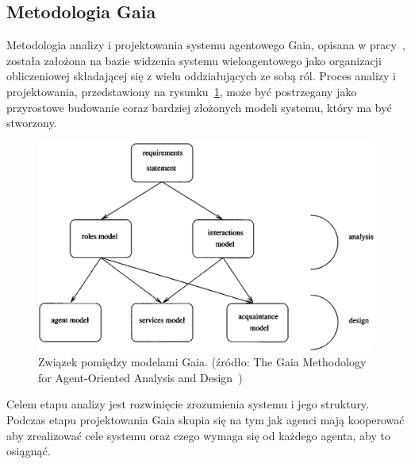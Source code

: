 \documentclass[11pt]{report}
\begin{document}
    \subsection{Metodologia Gaia}
    Metodologia analizy i projektowania systemu agentowego Gaia, opisana w pracy~\cite{Wooldridge2000a},
    została założona na bazie widzenia systemu wieloagentowego jako organizacji obliczeniowej składającej się z wielu oddziałujących ze sobą ról.
    Proces analizy i projektowania, przedstawiony na rysunku~\ref{fig:gaia}, może być postrzegany
    jako przyrostowe budowanie coraz bardziej złożonych modeli systemu, który ma być stworzony.
    \begin{figure}[!ht]
        \centering
        \includegraphics[width=\linewidth]{fig/gaia models.png}
        \caption{Związek pomiędzy modelami Gaia. (źródło: The Gaia Methodology for Agent-Oriented Analysis and Design~\cite{Wooldridge2000a})}
        \label{fig:gaia}
    \end{figure}
    Celem etapu analizy jest rozwinięcie zrozumienia systemu i jego struktury.
    Podczas etapu projektowania Gaia skupia się na tym jak agenci mają kooperować aby zrealizować cele systemu oraz czego wymaga się od każdego agenta, aby to osiągnąć.
\end{document}
